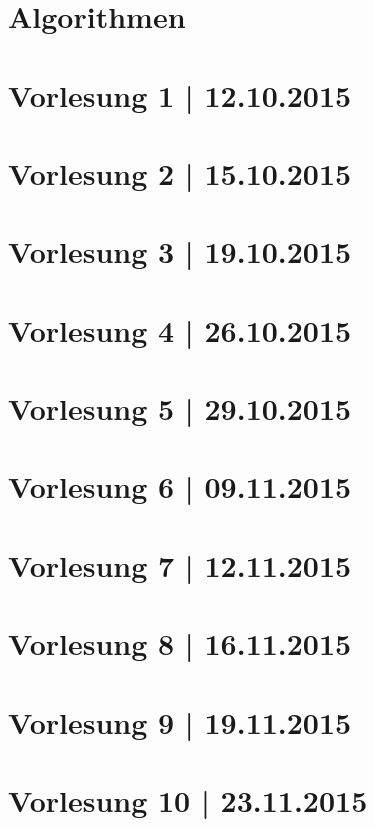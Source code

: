 



\maketitle
\thispagestyle{empty}

\newpage
\tableofcontents %
\clearpage

\newpage
\part{Algorithmen}
\part*{Vorlesung 1 | 12.10.2015}

\newpage
\part*{Vorlesung 2 | 15.10.2015}


\newpage
\part*{Vorlesung 3 | 19.10.2015}


\newpage
\part*{Vorlesung 4 | 26.10.2015}

\newpage
\part*{Vorlesung 5 | 29.10.2015}

\newpage
\part*{Vorlesung 6 | 09.11.2015}

\newpage
\part*{Vorlesung 7 | 12.11.2015}

\newpage
\part*{Vorlesung 8 | 16.11.2015}

\newpage
\part*{Vorlesung 9 | 19.11.2015}

\newpage
\part*{Vorlesung 10 | 23.11.2015}













